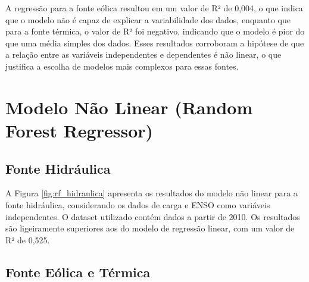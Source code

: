 \begin{figure}[!ht]
  {}
  {}
\end{figure}
\begin{figure}[!ht]
  {}
  {}
\end{figure}

A regressão para a fonte eólica resultou em um valor de R² de 0,004, o que indica que o modelo não é capaz de explicar a 
variabilidade dos dados, enquanto que para a fonte térmica, o valor de R² foi negativo, indicando que o modelo é pior do 
que uma média simples dos dados. Esses resultados corroboram a hipótese de que a relação entre as variáveis independentes 
e dependentes é não linear, o que justifica a escolha de modelos mais complexos para essas fontes.


\section{Modelo Não Linear (Random Forest Regressor)}
\subsection{Fonte Hidráulica}
\begin{figure}[!ht]
  {}
  {}
\end{figure}
A Figura \ref{fig:rf_hidraulica} apresenta os resultados do modelo não linear para a fonte hidráulica, considerando os dados 
de carga e ENSO como variáveis independentes. O dataset utilizado contém dados a partir de 2010. Os resultados são
ligeiramente superiores aos do modelo de regressão linear, com um valor de R² de 0,525.

\subsection{Fonte Eólica e Térmica}
\begin{figure}[!ht]
  {}
  {}
\end{figure}
\begin{figure}[!ht]
  {}
  {}
\end{figure}

